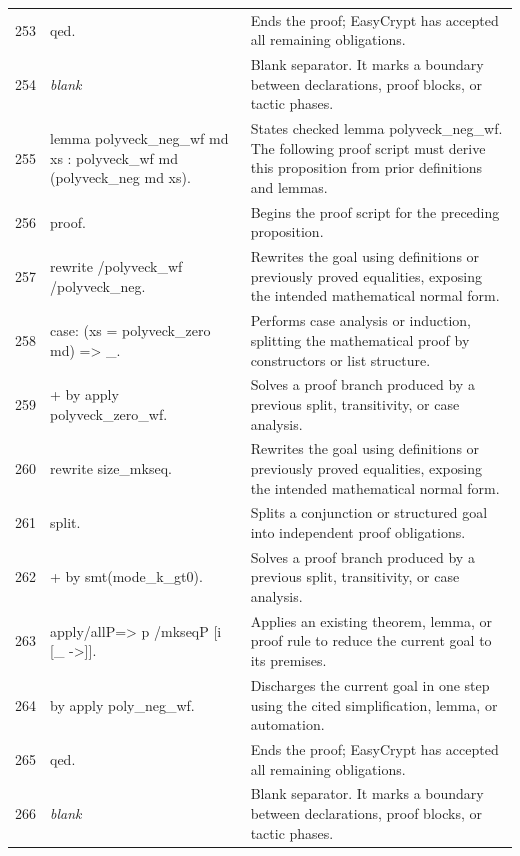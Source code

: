 \documentclass[10pt]{article}
\begin{document}
\begin{longtable}{r L{0.53\textwidth} L{0.37\textwidth}}
253 & {\ttfamily\scriptsize qed.} & Ends the proof; EasyCrypt has accepted all remaining obligations. \\
254 & {\ttfamily\scriptsize \emph{blank}} & Blank separator.  It marks a boundary between declarations, proof blocks, or tactic phases. \\
255 & {\ttfamily\scriptsize lemma polyveck\_neg\_wf md xs : polyveck\_wf md (polyveck\_neg md xs).} & States checked lemma polyveck\_neg\_wf.  The following proof script must derive this proposition from prior definitions and lemmas. \\
256 & {\ttfamily\scriptsize proof.} & Begins the proof script for the preceding proposition. \\
257 & {\ttfamily\scriptsize rewrite /polyveck\_wf /polyveck\_neg.} & Rewrites the goal using definitions or previously proved equalities, exposing the intended mathematical normal form. \\
258 & {\ttfamily\scriptsize case: (xs = polyveck\_zero md) => \_.} & Performs case analysis or induction, splitting the mathematical proof by constructors or list structure. \\
259 & {\ttfamily\scriptsize + by apply polyveck\_zero\_wf.} & Solves a proof branch produced by a previous split, transitivity, or case analysis. \\
260 & {\ttfamily\scriptsize rewrite size\_mkseq.} & Rewrites the goal using definitions or previously proved equalities, exposing the intended mathematical normal form. \\
261 & {\ttfamily\scriptsize split.} & Splits a conjunction or structured goal into independent proof obligations. \\
262 & {\ttfamily\scriptsize + by smt(mode\_k\_gt0).} & Solves a proof branch produced by a previous split, transitivity, or case analysis. \\
263 & {\ttfamily\scriptsize apply/allP=> p /mkseqP [i [\_ ->]].} & Applies an existing theorem, lemma, or proof rule to reduce the current goal to its premises. \\
264 & {\ttfamily\scriptsize by apply poly\_neg\_wf.} & Discharges the current goal in one step using the cited simplification, lemma, or automation. \\
265 & {\ttfamily\scriptsize qed.} & Ends the proof; EasyCrypt has accepted all remaining obligations. \\
266 & {\ttfamily\scriptsize \emph{blank}} & Blank separator.  It marks a boundary between declarations, proof blocks, or tactic phases. \\

\end{longtable}
\end{document}

